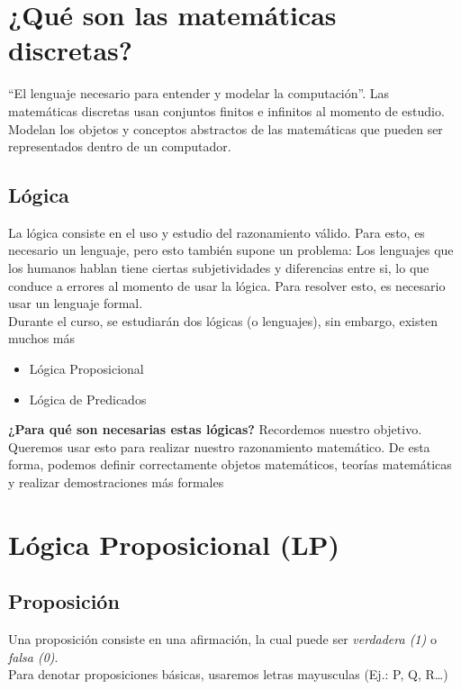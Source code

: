\documentclass[../main.tex]{subfiles}
\begin{document}
\section{¿Qué son las matemáticas discretas?}
``El lenguaje necesario para entender y modelar la computación''. Las matemáticas discretas usan conjuntos finitos e infinitos al momento de estudio. Modelan los objetos y conceptos abstractos de las matemáticas que pueden ser representados dentro de un computador.
\subsection{Lógica}
La lógica consiste en el uso y estudio del razonamiento válido. Para esto, es necesario un lenguaje, pero esto también supone un problema: Los lenguajes que los humanos hablan tiene ciertas subjetividades y diferencias entre si, lo que conduce a errores al momento de usar la lógica. Para resolver esto, es necesario usar un lenguaje formal.\\
Durante el curso, se estudiarán dos lógicas (o lenguajes), sin embargo, existen muchos más
\begin{itemize}
    \item Lógica Proposicional
    \item Lógica de Predicados
\end{itemize}
\textbf{¿Para qué son necesarias estas lógicas?} Recordemos nuestro objetivo. Queremos usar esto para realizar nuestro razonamiento matemático. De esta forma, podemos definir correctamente objetos matemáticos, teorías matemáticas y realizar demostraciones más formales

\section{Lógica Proposicional (LP)}
\subsection{Proposición}
Una proposición consiste en una afirmación, la cual puede ser \textit{verdadera (1)} o \textit{falsa (0)}.\\
Para denotar proposiciones básicas, usaremos letras mayusculas (Ej.: P, Q, R\ldots)
\end{document}
